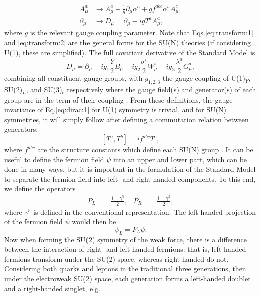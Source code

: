 \documentclass[a4paper,12pt]{article}
\begin{document}
\begin{align}
    \label{eq:transform:1}
    A^a_\mu &\to A^a_\mu + \frac{1}{g}\partial_\mu\alpha^a + gf^{abc}\alpha^bA^c_\mu, \\
    \label{eq:transform:2}
    \partial_\mu &\to D_\mu = \partial_\mu - igT^aA^a_\mu,
\end{align}
where $g$ is the relevant gauge coupling parameter.
Note that Eqs.\eqref{eq:transform:1} and \eqref{eq:transform:2} are the general forms for the SU(N) theories (if considering U(1), these are simplified).
The full covariant derivative of the Standard Model is
\begin{equation}
    \label{eq:covar}
    D_\mu = \partial_\mu - ig_1\frac{Y}{2}B_\mu - ig_2\frac{\sigma^i}{2}W^i_\mu - ig_3\frac{\lambda^a}{2}G^a_\mu,
\end{equation}
combining all constituent gauge groups, with $g_{1,2,3}$ the gauge coupling of U(1)$_Y$, SU(2)$_L$, and SU(3)$_c$ respectively where the gauge field(s) and generator(s) of each group are in the term of their coupling \cite{m}.   
From these definitions, the gauge invariance of Eq.\eqref{eq:dirac:1} for U(1) symmetry is trivial, and for SU(N) symmetries, it will simply follow after defining a commutation relation between generators:
\begin{equation}
    \label{eq:commute}
    [T^a,T^b] = if^{abc}T^c,
\end{equation}
where $f^{abc}$ are the structure constants which define each SU(N) group \cite{n}. 
It can be useful to define the fermion field $\psi$ into an upper and lower part, which can be done in many ways, but it is important in the formulation of the Standard Model to separate the fermion field into left- and right-handed components. 
To this end, we define the operators
\begin{align}
    \label{eq:helix}
    P_L &= \frac{1-\gamma^5}{2}, & P_R &= \frac{1+\gamma^5}{2},
\end{align}
where $\gamma^5$ is defined in the conventional representation. 
The left-handed projection of the fermion field $\psi$ would then be
\begin{equation}
    \label{eq:projection}
    \psi_L = P_L\psi.
\end{equation}
Now when forming the SU(2) symmetry of the weak force, there is a difference between the interaction of right- and left-handed fermions: that is, left-handed fermions transform under the SU(2) space, whereas right-handed do not.
Considering both quarks and leptons in the traditional three generations, then under the electroweak SU(2) space, each generation forms a left-handed doublet and a right-handed singlet, e.g.
\end{document}
